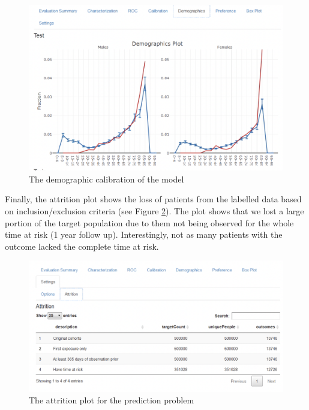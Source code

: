 \documentclass[11pt]{book}
\theoremstyle{definition}
\theoremstyle{definition}
\theoremstyle{definition}
\theoremstyle{remark}
\begin{document}
\begin{figure}

{\centering \includegraphics[width=1\linewidth]{images/PatientLevelPrediction/shiny/singleShiny/singleShinyDemo} 

}

\caption{The demographic calibration of the model}\label{fig:shinyDemo}
\end{figure}

Finally, the attrition plot shows the loss of patients from the labelled data based on inclusion/exclusion criteria (see Figure \ref{fig:shinyAtt}). The plot shows that we lost a large portion of the target population due to them not being observed for the whole time at risk (1 year follow up). Interestingly, not as many patients with the outcome lacked the complete time at risk.

\begin{figure}

{\centering \includegraphics[width=1\linewidth]{images/PatientLevelPrediction/shiny/singleShiny/singleShinyAtt} 

}

\caption{The attrition plot for the prediction problem}\label{fig:shinyAtt}
\end{figure}
\end{document}
